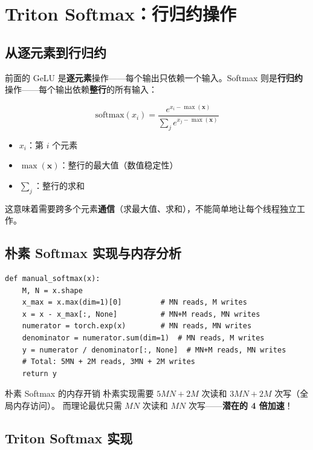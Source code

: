 \section{Triton Softmax：行归约操作}

\subsection{从逐元素到行归约}

前面的 GeLU 是\textbf{逐元素}操作——每个输出只依赖一个输入。Softmax 则是\textbf{行归约}操作——每个输出依赖\textbf{整行}的所有输入：

$$\text{softmax}(x_i) = \frac{e^{x_i - \max(\mathbf{x})}}{\sum_j e^{x_j - \max(\mathbf{x})}}$$

\begin{itemize}
    \item $x_i$：第 $i$ 个元素
    \item $\max(\mathbf{x})$：整行的最大值（数值稳定性）
    \item $\sum_j$：整行的求和
\end{itemize}

这意味着需要跨多个元素\textbf{通信}（求最大值、求和），不能简单地让每个线程独立工作。

\subsection{朴素 Softmax 实现与内存分析}

\begin{lstlisting}[caption={朴素 Softmax 实现及内存读写分析}]
def manual_softmax(x):
    M, N = x.shape
    x_max = x.max(dim=1)[0]         # MN reads, M writes
    x = x - x_max[:, None]          # MN+M reads, MN writes
    numerator = torch.exp(x)        # MN reads, MN writes
    denominator = numerator.sum(dim=1)  # MN reads, M writes
    y = numerator / denominator[:, None]  # MN+M reads, MN writes
    # Total: 5MN + 2M reads, 3MN + 2M writes
    return y
\end{lstlisting}

\begin{importantbox}{朴素 Softmax 的内存开销}
朴素实现需要 $5MN + 2M$ 次读和 $3MN + 2M$ 次写（全局内存访问）。
而理论最优只需 $MN$ 次读和 $MN$ 次写——\textbf{潜在的 4 倍加速}！
\end{importantbox}

\subsection{Triton Softmax 实现}

